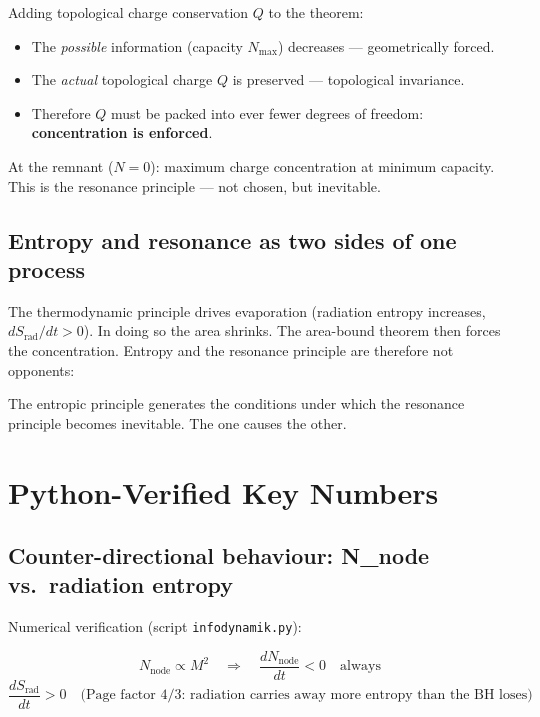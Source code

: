 Adding topological charge conservation $Q$ to the theorem:

\begin{erkenntnis}
\begin{itemize}
  \item The \emph{possible} information (capacity $N_\text{max}$) decreases --- geometrically forced.
  \item The \emph{actual} topological charge $Q$ is preserved --- topological invariance.
  \item Therefore $Q$ must be packed into ever fewer degrees of freedom: \textbf{concentration is enforced}.
\end{itemize}
At the remnant ($N = 0$): maximum charge concentration at minimum capacity. This is the resonance principle --- not chosen, but inevitable.
\end{erkenntnis}

\subsection{Entropy and resonance as two sides of one process}

The thermodynamic principle drives evaporation (radiation entropy increases, $dS_\text{rad}/dt > 0$). In doing so the area shrinks. The area-bound theorem then forces the concentration. Entropy and the resonance principle are therefore not opponents:

\begin{erkenntnis}
The entropic principle generates the conditions under which the resonance principle becomes inevitable. The one causes the other.
\end{erkenntnis}

\section{Python-Verified Key Numbers}

\subsection{Counter-directional behaviour: N\_node vs.\ radiation entropy}

Numerical verification (script \texttt{infodynamik.py}):

\begin{equation}
  N_\text{node} \propto M^2 \quad \Rightarrow \quad \frac{dN_\text{node}}{dt} < 0 \quad \text{always}
\end{equation}
\begin{equation}
  \frac{dS_\text{rad}}{dt} > 0 \quad \text{(Page factor 4/3: radiation carries away more entropy than the BH loses)}
\end{equation}

